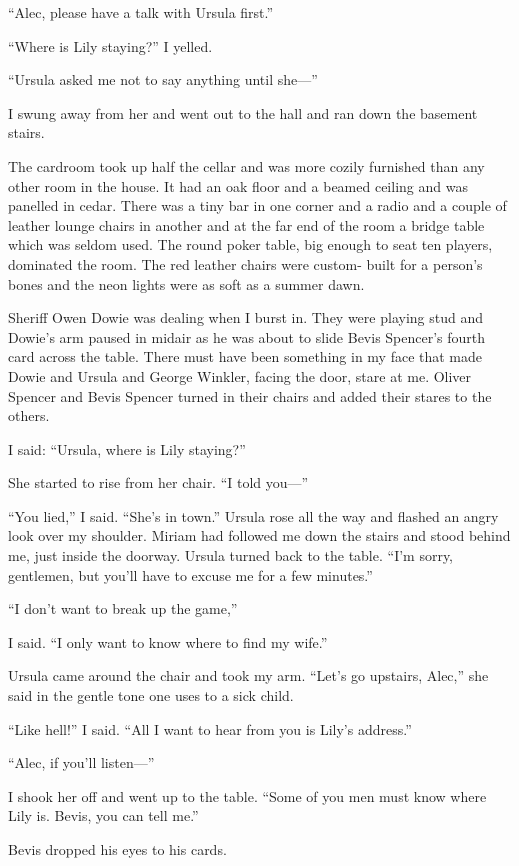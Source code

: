 \documentclass{novel}
\begin{document}
{“Alec, please have a talk with Ursula first.”

“Where is Lily staying?” I yelled.

“Ursula asked me not to say anything until she—”

I swung away from her and went out to the hall and ran down the basement stairs.

The cardroom took up half the cellar and was more cozily furnished than any other room in the house. It had an oak floor and a beamed ceiling and was panelled in cedar. There was a tiny bar in one corner and a radio and a couple of leather lounge chairs in another and at the far end of the room a bridge table which was seldom used. The round poker table, big enough to seat ten players, dominated the room. The red leather chairs were custom- built for a person’s bones and the neon lights were as soft as a summer dawn.

Sheriff Owen Dowie was dealing when I burst in. They were playing stud and Dowie’s arm paused in midair as he was about to slide Bevis Spencer’s fourth card across the table. There must have been something in my face that made Dowie and Ursula and George Winkler, facing the door, stare at me. Oliver Spencer and Bevis Spencer turned in their chairs and added their stares to the others.

I said: “Ursula, where is Lily staying?”

She started to rise from her chair. “I told you—”

“You lied,” I said. “She’s in town.” Ursula rose all the way and flashed an angry look over my shoulder. Miriam had followed me down the stairs and stood behind me, just inside the doorway. Ursula turned back to the table. “I’m sorry, gentlemen, but you’ll have to excuse me for a few minutes.”

“I don’t want to break up the game,”

I said. “I only want to know where to find my wife.”

Ursula came around the chair and took my arm. “Let’s go upstairs, Alec,” she said in the gentle tone one uses to a sick child.

“Like hell!” I said. “All I want to hear from you is Lily’s address.”

“Alec, if you’ll listen—”

I shook her off and went up to the table. “Some of you men must know where Lily is. Bevis, you can tell me.”

Bevis dropped his eyes to his cards.

}
\end{document}

